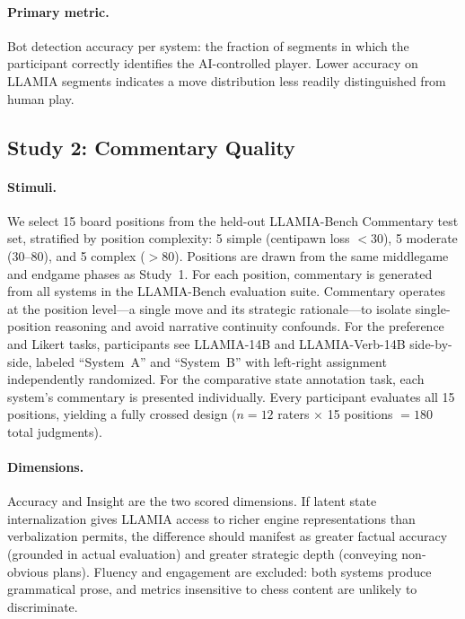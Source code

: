 \paragraph{Primary metric.}
Bot detection accuracy per system: the fraction of segments in which the participant correctly identifies the AI-controlled player. Lower accuracy on LLAMIA segments indicates a move distribution less readily distinguished from human play.

\subsection{Study 2: Commentary Quality}
\label{sec:app_human_commentary}

\paragraph{Stimuli.}
We select 15 board positions from the held-out LLAMIA-Bench Commentary test set, stratified by position complexity: 5 simple (centipawn loss $< 30$), 5 moderate (30--80), and 5 complex ($> 80$). Positions are drawn from the same middlegame and endgame phases as Study~1. For each position, commentary is generated from all systems in the LLAMIA-Bench evaluation suite. Commentary operates at the position level---a single move and its strategic rationale---to isolate single-position reasoning and avoid narrative continuity confounds. For the preference and Likert tasks, participants see LLAMIA-14B and LLAMIA-Verb-14B side-by-side, labeled ``System~A'' and ``System~B'' with left-right assignment independently randomized. For the comparative state annotation task, each system's commentary is presented individually. Every participant evaluates all 15 positions, yielding a fully crossed design ($n = 12$ raters $\times$ 15 positions $= 180$ total judgments).

\paragraph{Dimensions.}
Accuracy and Insight are the two scored dimensions. If latent state internalization gives LLAMIA access to richer engine representations than verbalization permits, the difference should manifest as greater factual accuracy (grounded in actual evaluation) and greater strategic depth (conveying non-obvious plans). Fluency and engagement are excluded: both systems produce grammatical prose, and metrics insensitive to chess content are unlikely to discriminate.

